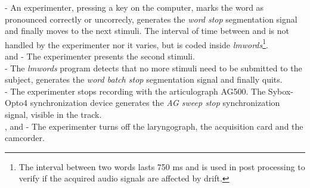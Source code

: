  - An experimenter, pressing a key on the  computer, 
marks the word as pronounced correctly or uncorrecly, generates the
\emph{word stop}
segmentation signal and finally moves to the next stimuli.
The interval of time between  and  is not handled
by the experimenter nor it varies, but is coded inside
\emph{lmwords}\footnote{The interval between two words lasts 750 ms and is
used in post processing to verify if the acquired audio signals are affected by 
drift.}.\\

 and  - The experimenter presents the second 
stimuli.\\

 - The \emph{lmwords} program detects that no more stimuli need to be 
submitted to the subject, generates the \emph{word batch stop} segmentation
signal
and finally quits.\\

 - The experimenter stops recording with the articulograph AG500. 
The Sybox-Opto4 synchronization device generates the \emph{AG sweep stop}
synchronization signal, visible in the  track.\\

,  and  - The experimenter turns off the
laryngograph,
the acquisition card and the
camcorder.\\

